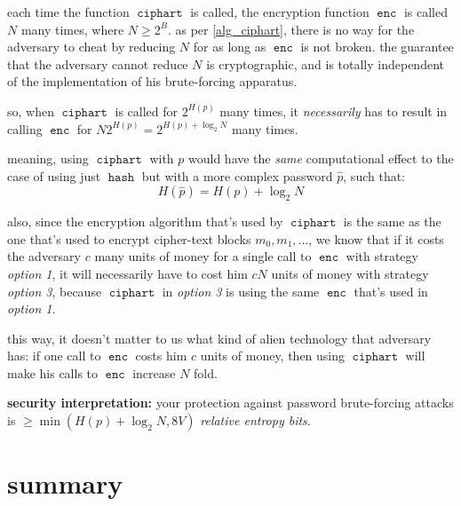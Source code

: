 \documentclass[twocolumn]{article}
\DeclareMathOperator{\enc}{\texttt{enc}}
\DeclareMathOperator{\hash}{\texttt{hash}}
\DeclareMathOperator{\ciphart}{\texttt{ciphart}}
\begin{document}
each time the function $\ciphart$ is called, the encryption function $\enc$ is
called $N$ many times, where $N\ge2^B$.  as per \cref{alg_ciphart}, there
is no way for the adversary to cheat by reducing $N$ for as long as $\enc$
is not broken.  the guarantee that the adversary cannot reduce $N$ is
cryptographic, and is totally independent of the implementation of his
brute-forcing apparatus.

so, when $\ciphart$ is called for $2^{H(p)}$ many times, it \emph{necessarily}
has to result in calling $\enc$ for $N2^{H(p)} = 2^{H(p) + \log_2N}$ many
times.

meaning, using $\ciphart$ with $p$ would have the \emph{same} computational
effect to the case of using just $\hash$ but with a more complex password
$\hat p$, such that:
\begin{equation}
    H(\hat p) = H(p) + \log_2 N
\end{equation}

also, since the encryption algorithm that's used by $\ciphart$ is the same as
the one that's used to encrypt cipher-text blocks $m_0, m_1, \ldots$, we
know that if it costs the adversary $c$ many units of money for a single
call to $\enc$ with strategy \emph{option 1}, it will necessarily have to
cost him $cN$ units of money with strategy \emph{option 3}, because $\ciphart$
in \emph{option 3} is using the same $\enc$ that's used in \emph{option 1}.

this way, it doesn't matter to us what kind of alien technology that
adversary has:  if one call to $\enc$ costs him $c$ units of money, then
using $\ciphart$ will make his calls to $\enc$ increase $N$ fold.

\textbf{security interpretation:}  your protection against password
brute-forcing attacks is $\ge \min(H(p) + \log_2 N, 8V)$ \emph{relative
entropy bits}.

\section{summary}
\end{document}

